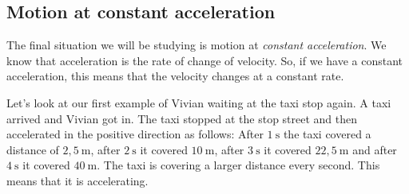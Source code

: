             \subsection*{Motion at constant acceleration}
            \nopagebreak
        \label{m38795*id71822}The final situation we will be studying is motion at \textsl{constant acceleration}. We know that acceleration is the rate of change of velocity. So, if we have a constant acceleration, this means that the velocity changes at a constant rate.\par 
        \label{m38795*id71827}Let's look at our first example of Vivian waiting at the taxi stop again. A taxi arrived and Vivian got in. The taxi stopped at the stop street and then accelerated in the positive direction as follows: After $1~\text{s}$ the taxi covered a distance of $2,5~\text{m}$, after $2~\text{s}$ it covered $10~\text{m}$, after $3~\text{s}$ it covered $22,5~\text{m}$ and after $4~\text{s}$ it covered $40~\text{m}$. The taxi is covering a larger distance every second. This means that it is accelerating.\par 
    \setcounter{subfigure}{0}
